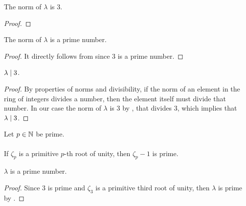 \begin{lemma}
    \label{lmm:norm_lambda}
    \leanok
    The norm of $\lambda$ is $3$.
\end{lemma}
\begin{proof}
    \leanok
\end{proof}

\begin{lemma}
    \label{lmm:norm_lambda_prime}
    \leanok
    The norm of $\lambda$ is a prime number.
\end{lemma}
\begin{proof}
    \leanok
    It directly follows from  since $3$ is a prime number.
\end{proof}

\begin{lemma}
    \label{lmm:lambda_dvd_three}
    \leanok
    $\lambda \mid 3$.
\end{lemma}
\begin{proof}
    \leanok
    By properties of norms and divisibility, if the norm of an element in the ring of integers
    divides a number, then the element itself must divide that number.
    In our case the norm of $\lambda$ is $3$ by , that divides $3$,
    which implies that $\lambda \mid 3$.
\end{proof}

\begin{theorem}
    \label{thm:zeta_sub_one_prime1}
    \leanok
    Let $p \in \mathbb{N}$ be prime. \\\\
    If $\zeta_p$ is a primitive $p$-th root of unity, then $\zeta_p - 1$ is prime.
\end{theorem}

\begin{lemma}
    \label{lmm:lambda_prime}
    \leanok
    $\lambda$ is a prime number.
\end{lemma}
\begin{proof}
    \leanok
    Since $3$ is prime and $\zeta_3$ is a primitive third root of unity, then $\lambda$ is prime
    by .
\end{proof}

